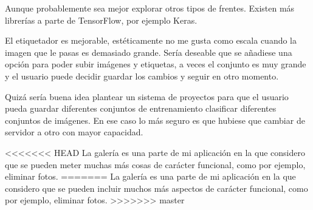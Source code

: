 Aunque probablemente sea mejor explorar otros tipos de frentes. Existen más librerías a parte de TensorFlow, por ejemplo Keras.

El etiquetador es mejorable, estéticamente no me gusta como escala cuando la imagen que le pasas es demasiado grande.
Sería deseable que se añadiese una opción para poder subir imágenes y etiquetas, a veces el conjunto es muy grande y el usuario puede decidir guardar los cambios y seguir en otro momento.

Quizá sería buena idea plantear un sistema de proyectos para que el usuario pueda guardar diferentes conjuntos de entrenamiento clasificar diferentes conjuntos de imágenes. En ese caso lo más seguro es que hubiese que cambiar de servidor a otro con mayor capacidad.

<<<<<<< HEAD
La galería es una parte de mi aplicación en la que considero que se pueden meter muchas más cosas de carácter funcional, como por ejemplo, eliminar fotos.
=======
La galería es una parte de mi aplicación en la que considero que se pueden incluir muchos más aspectos de carácter funcional, como por ejemplo, eliminar fotos.
>>>>>>> master

